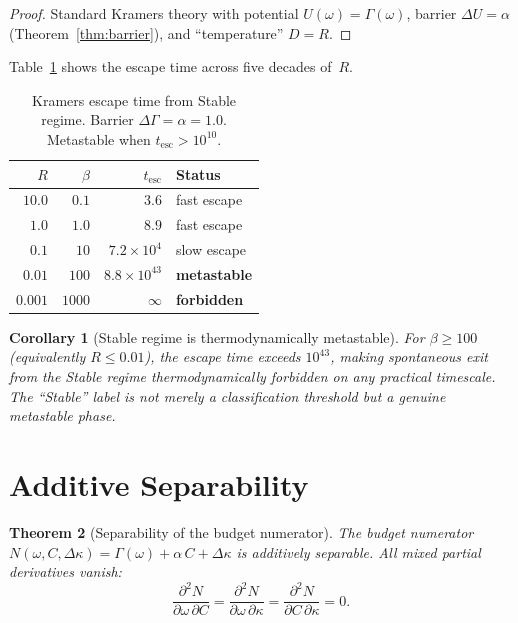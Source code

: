 \documentclass[
  aps,
  prd,
  twocolumn,
  showpacs,
  superscriptaddress,
  nofootinbib,
  floatfix
]{revtex4-2}
\newtheorem{theorem}{Theorem}
\newtheorem{corollary}[theorem]{Corollary}
\newcommand{\Gam}{\Gamma}
\newcommand{\beq}{\begin{equation}}
\newcommand{\eeq}{\end{equation}}
\begin{document}
\begin{proof}
Standard Kramers theory \cite{kramers1940brownian} with
potential $U(\omega)=\Gam(\omega)$, barrier
$\Delta U=\alpha$ (Theorem~\ref{thm:barrier}), and
``temperature'' $D=R$.
\end{proof}

Table~\ref{tab:kramers} shows the escape time across five
decades of~$R$.

\begin{table}[b]
\caption{\label{tab:kramers}Kramers escape time from Stable regime.
  Barrier $\Delta\Gam=\alpha=1.0$.  Metastable when
  $t_{\mathrm{esc}}>10^{10}$.}
\begin{ruledtabular}
\begin{tabular}{rrrl}
$R$ & $\beta$ & $t_{\mathrm{esc}}$ & Status \\
\hline
$10.0$   &  $0.1$   & $3.6$               & fast escape \\
$1.0$    &  $1.0$   & $8.9$               & fast escape \\
$0.1$    &  $10$    & $7.2\times10^{4}$   & slow escape \\
$0.01$   &  $100$   & $8.8\times10^{43}$  & \textbf{metastable} \\
$0.001$  &  $1000$  & $\infty$            & \textbf{forbidden} \\
\end{tabular}
\end{ruledtabular}
\end{table}

\begin{corollary}[Stable regime is thermodynamically metastable]
For $\beta\geq 100$ (equivalently $R\leq 0.01$), the escape
time exceeds $10^{43}$, making spontaneous exit from the Stable
regime thermodynamically forbidden on any practical timescale.
The ``Stable'' label is not merely a classification threshold
but a genuine metastable phase.
\end{corollary}

\section{Additive Separability}\label{sec:separability}

\begin{theorem}[Separability of the budget numerator]
\label{thm:separability}
The budget numerator $N(\omega,C,\Delta\kappa) = \Gam(\omega)
+ \alpha\,C + \Delta\kappa$ is additively separable.
All mixed partial derivatives vanish:
\beq\label{eq:separability}
  \frac{\partial^2 N}{\partial\omega\,\partial C}
  = \frac{\partial^2 N}{\partial\omega\,\partial\kappa}
  = \frac{\partial^2 N}{\partial C\,\partial\kappa}
  = 0.
\eeq
\end{theorem}
\end{document}
